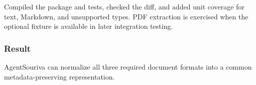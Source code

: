 Compiled the package and tests, checked the diff, and added unit coverage for text, Markdown, and unsupported types. PDF extraction is exercised when the optional fixture is available in later integration testing.

\subsubsection{Result}

AgentSouriva can normalize all three required document formats into a common metadata-preserving representation.


